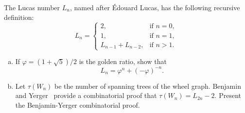 \begin{problem}
\item The Lucas number $L_n$, named after
  \'Edouard Lucas, has the following recursive
  definition:
  \[
  L_n
  =
  \begin{cases}
  2, & \text{if } n = 0, \\
  1, & \text{if } n = 1, \\
  L_{n-1} + L_{n-2}, & \text{if } n > 1.
  \end{cases}
  \]
  \begin{enumerate}[(a)]
  \item If $\varphi = (1 + \sqrt{5}) / 2$ is the
    golden ratio, show that
    \[
    L_n
    =
    \varphi^n + (-\varphi)^{-n}.
    \]

  \item Let $\tau(W_n)$ be the number of
    spanning trees of the
    wheel graph.
    Benjamin and
    Yerger~\cite{BenjaminYerger2006} provide a
    combinatorial proof that $\tau(W_n) = L_{2n} - 2$. Present the
    Benjamin-Yerger combinatorial proof.
  \end{enumerate}
\end{problem}
